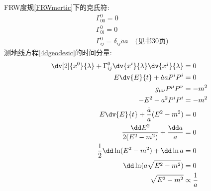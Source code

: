 FRW度规\ref{FRWmertic}下的克氏符:
\begin{align*}
    &\Gamma^0_{00} = 0\\
    &\Gamma^0_{0i} = 0\\
    &\Gamma^0_{ij} = \delta_{ij}\dot{a} a \quad\text{(见书30页)}
\end{align*}
测地线方程\ref{4dgeodesic}的时间分量:
\begin{align*}
    \dv[2]{x^0}{\lambda} + \Gamma^0_{ij}\dv{x^i}{\lambda}\dv{x^j}{\lambda} &= 0\\
    E\dv{E}{t} + \dot{a} aP^iP^i &= 0\\
    g_{\mu\nu}P^\mu P^\nu &= -m^2\\
    -E^2 + a^2P^iP^i &= -m^2\\
    E\dv{E}{t} + \frac{\dot{a}}{a}(E^2 - m^2) &= 0\\
    \frac{\dd E^2}{2(E^2-m^2)} + \frac{\dd a}{a}&=0\\
    \frac{1}{2}\dd \ln(E^2-m^2) + \dd \ln a &= 0\\
    \dd \ln(a \sqrt{E^2-m^2}) &= 0\\
    \sqrt{E^2-m^2} &\propto \frac{1}{a}
\end{align*}
